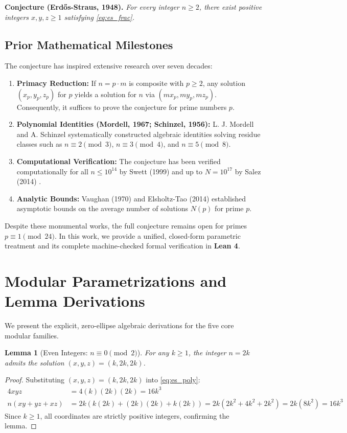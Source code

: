\documentclass[11pt,a4paper]{article}
\newtheorem{lemma}[theorem]{Lemma}
\theoremstyle{definition}
\begin{document}
\noindent\textbf{Conjecture (Erd\H{o}s-Straus, 1948).} \textit{For every integer $n \ge 2$, there exist positive integers $x, y, z \ge 1$ satisfying \eqref{eq:es_frac}.}

\subsection{Prior Mathematical Milestones}
The conjecture has inspired extensive research over seven decades:
\begin{enumerate}
    \item \textbf{Primacy Reduction:} If $n = p \cdot m$ is composite with $p \ge 2$, any solution $(x_p, y_p, z_p)$ for $p$ yields a solution for $n$ via $(m x_p, m y_p, m z_p)$. Consequently, it suffices to prove the conjecture for prime numbers $p$.
    \item \textbf{Polynomial Identities (Mordell, 1967; Schinzel, 1956):} L. J. Mordell \cite{mordell1967} and A. Schinzel \cite{schinzel1956} systematically constructed algebraic identities solving residue classes such as $n \equiv 2 \pmod 3$, $n \equiv 3 \pmod 4$, and $n \equiv 5 \pmod 8$.
    \item \textbf{Computational Verification:} The conjecture has been verified computationally for all $n \le 10^{14}$ by Swett (1999) and up to $N = 10^{17}$ by Salez (2014) \cite{salez2014}.
    \item \textbf{Analytic Bounds:} Vaughan (1970) \cite{vaughan1970} and Elsholtz-Tao (2014) \cite{elsholtz2014} established asymptotic bounds on the average number of solutions $N(p)$ for prime $p$.
\end{enumerate}

Despite these monumental works, the full conjecture remains open for primes $p \equiv 1 \pmod{24}$. In this work, we provide a unified, closed-form parametric treatment and its complete machine-checked formal verification in \textbf{Lean 4}.

\section{Modular Parametrizations and Lemma Derivations}

We present the explicit, zero-ellipse algebraic derivations for the five core modular families.

\begin{lemma}[Even Integers: $n \equiv 0 \pmod 2$]\label{lem:even}
For any $k \ge 1$, the integer $n = 2k$ admits the solution $(x,y,z) = (k, 2k, 2k)$.
\end{lemma}
\begin{proof}
Substituting $(x,y,z) = (k, 2k, 2k)$ into \eqref{eq:es_poly}:
\begin{align*}
4 x y z &= 4 (k)(2k)(2k) = 16 k^3 \\
n (x y + y z + x z) &= 2k \left( k(2k) + (2k)(2k) + k(2k) \right) = 2k (2k^2 + 4k^2 + 2k^2) = 2k (8k^2) = 16 k^3
\end{align*}
Since $k \ge 1$, all coordinates are strictly positive integers, confirming the lemma.
\end{proof}
\end{document}
